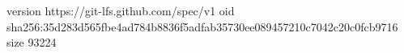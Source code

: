 version https://git-lfs.github.com/spec/v1
oid sha256:35d283d565fbe4ad784b8836f5adfab35730ee089457210c7042c20c0fcb9716
size 93224
